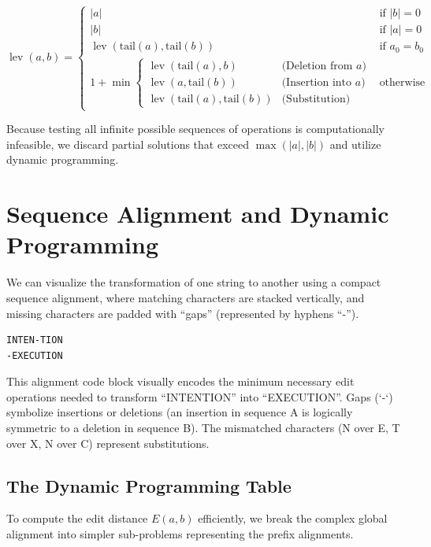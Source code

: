 \begin{center}
\[
\operatorname{lev}(a,b) = 
\begin{cases}
|a| & \text{if } |b| = 0 \\
|b| & \text{if } |a| = 0 \\
\operatorname{lev}(\text{tail}(a), \text{tail}(b)) & \text{if } a_0 = b_0 \\
1 + \min \begin{cases} 
\operatorname{lev}(\text{tail}(a), b) & \text{(Deletion from } a \text{)} \\
\operatorname{lev}(a, \text{tail}(b)) & \text{(Insertion into } a \text{)} \\
\operatorname{lev}(\text{tail}(a), \text{tail}(b)) & \text{(Substitution)}
\end{cases} & \text{otherwise}
\end{cases}
\]
\end{center}

Because testing all infinite possible sequences of operations is computationally infeasible, we discard partial solutions that exceed $\max(|a|, |b|)$ and utilize dynamic programming.

\section{Sequence Alignment and Dynamic Programming}

We can visualize the transformation of one string to another using a compact sequence alignment, where matching characters are stacked vertically, and missing characters are padded with ``gaps'' (represented by hyphens ``-'').
\begin{center}
\begin{verbatim}
INTEN-TION
-EXECUTION
\end{verbatim}
\end{center}
This alignment code block visually encodes the minimum necessary edit operations needed to transform ``INTENTION'' into ``EXECUTION''. Gaps (`-`) symbolize insertions or deletions (an insertion in sequence A is logically symmetric to a deletion in sequence B). The mismatched characters (N over E, T over X, N over C) represent substitutions.

\subsection{The Dynamic Programming Table}

To compute the edit distance \(E(a, b)\) efficiently, we break the complex global alignment into simpler sub-problems representing the prefix alignments.

